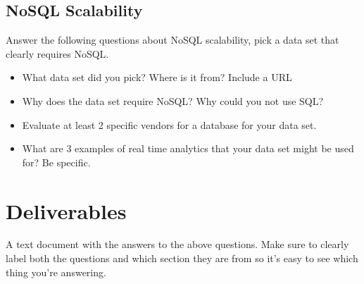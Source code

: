 \documentclass[12pt]{article}
\begin{document}
\subsection*{NoSQL Scalability}
    Answer the following questions about NoSQL scalability, pick a data set that clearly requires NoSQL. 
   
   \begin{itemize}
     \item What data set did you pick? Where is it from? Include a URL
     \item Why does the data set require NoSQL? Why could you not use SQL?
     \item Evaluate at least 2 specific vendors for a database for your data set.
     \item What are 3 examples of real time analytics that your data set might be used for?  Be specific.
   \end{itemize}

\section*{Deliverables}
A text document with the answers to the above questions. Make sure to clearly label both the questions and which section they are from so it's easy to see which thing you're answering. 
\end{document}
